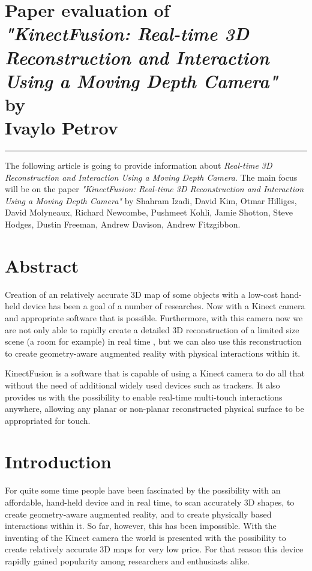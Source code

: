 \documentclass[12pt]{article}
\newcommand{\hr}{\rule{\linewidth}{0.1mm}}
\theoremstyle{plain}
\begin{document}


\section*{\centering
  Paper evaluation of\\
  \emph{"KinectFusion: Real-time 3D Reconstruction and Interaction Using a
    Moving Depth Camera"}\\
  by\\
  Ivaylo Petrov
}

\hr

The following article is going to provide information about \emph{Real-time 3D
Reconstruction and Interaction Using a Moving Depth Camera}. The main focus 
will be on the paper \emph{"KinectFusion: Real-time 3D Reconstruction and
Interaction Using a Moving Depth Camera"} by Shahram Izadi, David Kim,
Otmar Hilliges, David Molyneaux, Richard Newcombe, Pushmeet Kohli,
Jamie Shotton, Steve Hodges, Dustin Freeman, Andrew Davison, Andrew Fitzgibbon.

\section{Abstract} %
\label{sec:Abstract}
  Creation of an relatively accurate 3D map of some objects with a low-cost 
  hand-held device has been a goal of a number of researches. Now with a Kinect
  camera and appropriate software that is possible. Furthermore, with this 
  camera now we are not only able to rapidly create a detailed 3D reconstruction
  of a limited size scene (a room for example) in real time \cite{kinectfusion},
  but we can also use this reconstruction to create geometry-aware augmented
  reality with physical interactions within it. 

  KinectFusion is a software that is capable of using a Kinect camera to do all
  that without the need of additional widely used devices such as trackers. It
  also provides us with the possibility to enable real-time multi-touch
  interactions anywhere, allowing any planar or non-planar reconstructed
  physical surface to be appropriated for touch.

\section{Introduction} %
\label{sec:Introduction}
  For quite some time people have been fascinated by the possibility with an 
  affordable, hand-held device and in real time, to scan accurately 3D shapes,  
  to create geometry-aware augmented reality, and to create physically based
  interactions within it. So far, however, this has been impossible. With the
  inventing of the Kinect camera the world is presented with the possibility to
  create relatively accurate 3D maps for very low price. For that reason this
  device rapidly gained popularity among researchers and enthusiasts alike.
\end{document}
